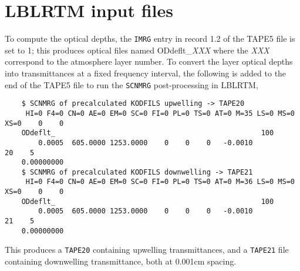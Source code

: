 \section{LBLRTM input files}
\label{appdx:tape5_files}
To compute the optical depths, the \texttt{IMRG} entry in record 1.2 of the TAPE5 file is set to 1; this produces optical files named ODdeflt\_\textit{XXX} where the \textit{XXX} correspond to the atmosphere layer number. To convert the layer optical depths into transmittances at a fixed frequency interval, the following is added to the end of the TAPE5 file to run the \texttt{SCNMRG} post-processing in LBLRTM,

\begin{ttfamily}
  \begin{verbatim}
    $ SCNMRG of precalculated KODFILS upwelling -> TAPE20
     HI=0 F4=0 CN=0 AE=0 EM=0 SC=0 FI=0 PL=0 TS=0 AT=0 M=35 LS=0 MS=0 XS=0    0    0
    ODdeflt_                                                 100
        0.0005  605.0000 1253.0000    0    0    0   -0.0010                  20    5
    0.00000000
    $ SCNMRG of precalculated KODFILS downwelling -> TAPE21
     HI=0 F4=0 CN=0 AE=0 EM=0 SC=0 FI=0 PL=0 TS=0 AT=0 M=36 LS=0 MS=0 XS=0    0    0
    ODdeflt_                                                 100
        0.0005  605.0000 1253.0000    0    0    0   -0.0010                  21    5
    0.00000000
  \end{verbatim}
\end{ttfamily}

This produces a \texttt{TAPE20} containing upwelling transmittances, and a \texttt{TAPE21} file containing downwelling transmittance, both at 0.001cm spacing.

